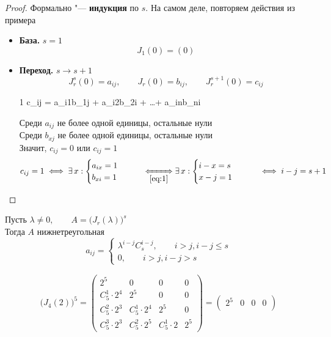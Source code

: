 \begin{props}
\begin{eg}
	\end{eg}
	\begin{proof}
		Формально "--- \textbf{индукция} по $ s $. На самом деле, повторяем действия из примера
		\begin{itemize}
			\item \textbf{База.} $ s = 1 $
			$$ J_1(0) = (0) $$
			\item \textbf{Переход.} $ s \to s + 1 $
			$$ J_r^s(0) = a_{ij}, \qquad J_r(0) = b_{ij}, \qquad J_r^{s + 1}(0) = c_{ij} $$
			\begin{equ}1
				c_{ij} = a_{i1}b_{1j} + a_{i2}b_{2i} + \dots + a_{in}b_{ni}
			\end{equ}
			Среди $ a_{ij} $ не более одной единицы, остальные нули \\
			Среди $ b_{xj} $ не более одной единицы, остальные нули \\
			Значит, $ c_{ij} = 0 $ или $ c_{ij} = 1 $
			$$ c_{ij} = 1 \iff \exist x :
			\begin{cases}
				a_{ix} = 1 \\
				b_{xi} = 1
			\end{cases} \qquad \underiff{\eref1} \exist x :
			\begin{cases}
				i - x = s \\
				x - j = 1
			\end{cases} \qquad \iff i - j = s + 1 $$
		\end{itemize}
	\end{proof}
	\item Пусть $ \lambda \ne 0, \qquad A = \bigg( J_r(\lambda) \bigg)^s $ \\
	Тогда $ A $ нижнетреугольная
	$$ a_{ij} =
	\begin{cases}
		\lambda^{i - j}C_s^{i - j}, \qquad i > j, i - j \le s \\
		0, \qquad i > j, i - j > s
	\end{cases} $$
	\begin{eg}
		\begin{multline*}
			\bigg( J_4(2) \bigg)^5 =
			\begin{pmatrix}
				2^5 & 0 & 0 & 0 \\
				C_5^1 \cdot 2^4 & 2^5 & 0 & 0 \\
				C_5^2 \cdot 2^3 & C_5^1 \cdot 2^4 & 2^5 & 0 \\
				C_5^3 \cdot 2^3 & C_5^2 \cdot 2^5 & C_5^1 \cdot 2 & 2^5
			\end{pmatrix} =
			\begin{pmatrix}
				2^5 & 0 & 0 & 0 \\

\end{pmatrix}
\end{multline*}
\end{eg}
\end{props}
